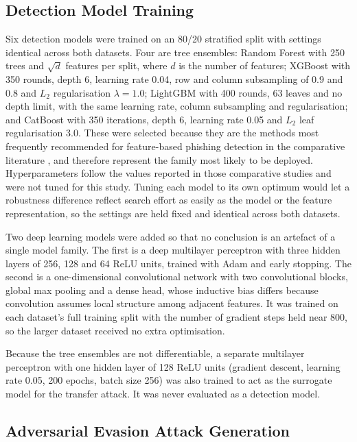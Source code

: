 \documentclass[runningheads]{llncs}
\begin{document}
\subsection{Detection Model Training}
\label{sec:models}

Six detection models were trained on an 80/20 stratified split with settings
identical across both datasets. Four are tree ensembles: Random Forest with 250
trees and $\sqrt{d}$ features per split, where $d$ is the number of features;
XGBoost with 350 rounds, depth 6, learning rate 0.04, row and column subsampling
of 0.9 and 0.8 and $L_2$ regularisation $\lambda = 1.0$; LightGBM with 400 rounds,
63 leaves and no depth limit, with the same learning rate, column subsampling
and regularisation; and CatBoost with 350 iterations, depth 6, learning
rate 0.05 and $L_2$ leaf regularisation 3.0. These were selected because they are
the methods most frequently recommended for feature-based phishing detection in
the comparative literature \cite{hannousse2021,prasad2024}, and therefore
represent the family most likely to be deployed. Hyperparameters follow the values reported in those comparative studies and were
not tuned for this study. Tuning each model to its own optimum would let a robustness
difference reflect search effort as easily as the model or the feature
representation, so the settings are held fixed and identical across both datasets.

Two deep learning models were added so that no conclusion is an artefact of a
single model family. The first is a deep multilayer perceptron with three hidden layers of
256, 128 and 64 ReLU units, trained with Adam and early stopping. The second is a one-dimensional convolutional network with two convolutional
blocks, global max pooling and a dense head, whose inductive bias differs
because convolution assumes local structure among adjacent features. It was trained on each dataset's
full training split with the number of gradient steps held near 800, so the
larger dataset received no extra optimisation.

Because the tree ensembles are not differentiable, a separate multilayer
perceptron with one hidden layer of 128 ReLU units (gradient descent,
learning rate 0.05, 200 epochs, batch size 256) was also trained to act as the surrogate model for the transfer attack. It
was never evaluated as a detection model.

\subsection{Adversarial Evasion Attack Generation}
\label{sec:method-attacks}
\end{document}
